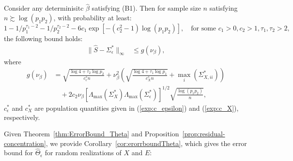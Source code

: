 %
%
%
%

\begin{proposition}\label{prop:residual-concentration}
Consider any determinisitc $\widehat{\beta}$ satisfying (B1). Then for sample size $n$ satisfying $n \succsim \log(p_1p_2)$, 
% 
with probability at least:
\begin{equation*}
1-1/p_1^{\tau_1-2}-1/p_2^{\tau_2-2}-6c_1\exp[-(c_2^2-1)\log (p_1p_2)], \quad \text{for some }c_1>0,c_2>1,\tau_1,\tau_2>2,
\end{equation*}
the following bound holds: 
\begin{equation}\label{bound:S-hat}
\begin{split}
\|\widehat{S} - \Sigma^*_\epsilon\|_\infty &\leq g(\nu_\beta),
\end{split} 
\end{equation}
where
\begin{equation}\label{g-expression}
\begin{split}
g(\nu_\beta) & = \sqrt{\frac{\log 4 + \tau_2 \log p_2}{c^*_\epsilon n}} + \nu_\beta^2 \left( \sqrt{\frac{\log 4 + \tau_1 \log p_1}{c^*_Xn}} +  \max_i(\Sigma^*_{X,ii})\right)\\
& \quad + 2c_2\nu_\beta\left[\Lambda_{\max}(\Sigma^*_X)\Lambda_{\max}(\Sigma^*_\epsilon)\right]^{1/2} \sqrt{\frac{\log (p_1p_2) }{n}},
\end{split}
\end{equation}
$c_\epsilon^*$ and $c_X^*$ are population quantities given in (\ref{exp:c_epsilon}) and (\ref{exp:c_X}), respectively.
\end{proposition} 

%
%
%
%

Given Theorem~\ref{thm:ErrorBound_Theta} and Proposition~\ref{prop:residual-concentration}, we provide Corollary~\ref{cor:erorrboundTheta}, which gives the error bound for $\widehat{\Theta}_\epsilon$ for random realizations of $X$ and $E$:

